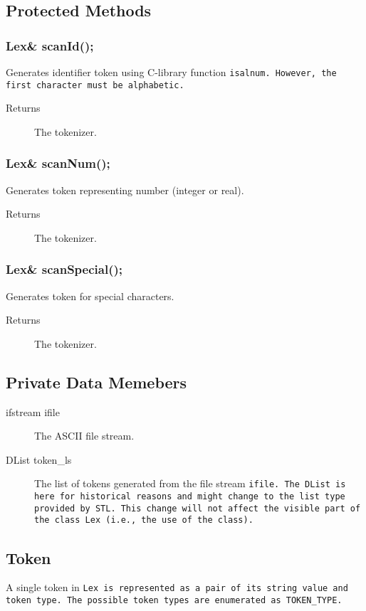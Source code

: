 \subsection{Protected Methods}

\subsubsection{Lex\& scanId();}
Generates identifier token using C-library function \tt isalnum\rm. 
However, the first character must be alphabetic. 
\begin{description}
  \item [Returns] The tokenizer.
\end{description}

\subsubsection{Lex\& scanNum();}  
Generates token representing number (integer or real).
\begin{description}
  \item [Returns] The tokenizer.
\end{description}

\subsubsection{Lex\& scanSpecial();}
Generates token for special characters.
\begin{description}
  \item [Returns] The tokenizer.   
\end{description}

\subsection{Private Data Memebers}
\begin{description}
  \item [ifstream ifile] The ASCII file stream.
  \item [DList token\_ls] The list of tokens generated 
   from the file stream \tt ifile\rm. The \tt DList \rm
   is here for historical reasons and might change to the \tt list
  \rm type provided by STL. This change will not affect the visible part
   of the class \tt Lex \rm (i.e., the use of the class). 
\end{description}

\subsection{Token}
A single token in \tt Lex \rm is represented as a pair of its string value and 
token type. The possible token types are enumerated as 
\tt TOKEN\_TYPE\rm.

